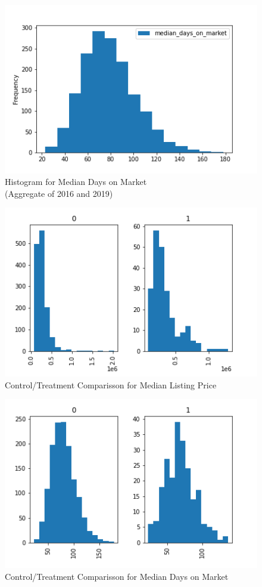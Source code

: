 \begin{figure}[h]
    \centering
    \includegraphics[width=.8\linewidth]{../data_and_processing/media/days_on_mkt_hist.png}
    \caption{Histogram for Median Days on Market \\ (Aggregate of 2016 and 2019)}
    \label{days_on_mkt_hist}
\end{figure}

\begin{figure}[h]
    \centering
    \includegraphics[width=.8\linewidth]{../data_and_processing/media/lst_prc_hist_comp.png}
    \caption{Control/Treatment Comparisson for Median Listing Price}
    \label{lst_prc_hist_comp}
\end{figure}

\begin{figure}[h]
    \centering
    \includegraphics[width=.8\linewidth]{../data_and_processing/media/days_on_mkt_hist_comp.png}
    \caption{Control/Treatment Comparisson for Median Days on Market}
    \label{days_on_mkt_hist_comp}
\end{figure}

